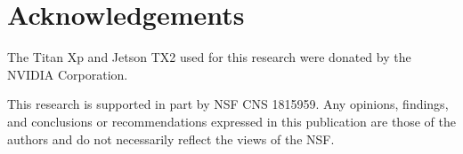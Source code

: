 \section*{Acknowledgements} \label{acknowledge}
The Titan Xp and Jetson TX2 used for this research were donated by the
NVIDIA Corporation.

This research is supported in part by NSF CNS 1815959. Any opinions, findings,
and conclusions or recommendations expressed in this publication are
those of the authors and do not necessarily reflect the views of the
NSF.
